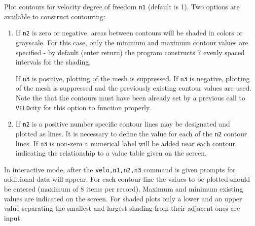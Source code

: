 \headb

Plot contours for velocity degree of freedom {\tt n1}
(default is 1).
Two options are available to construct contouring:
\begin{enumerate}
\item{
If {\tt n2} is zero or negative, areas between contours
will be shaded in colors or grayscale.  For this case, only
the minimum and maximum contour values are specified - by
default (enter return) the program constructs 7 evenly
spaced intervals for the shading.

If {\tt n3} is positive, plotting of the mesh is suppressed.
If {\tt n3} is negative, plotting
of the mesh is suppressed and the previously existing
contour values are used.  Note the that the contours must
have been already set by a previous call to {\tt VELO}city for this
option to function properly.}
\item{
If {\tt n2} is a positive number specific contour lines may be designated
and plotted as lines. It is necessary to define the value for each of the
{\tt n2} contour lines.
If {\tt n3} is non-zero a numerical label will
be added near each contour indicating the relationship to a
value table given on the screen.}
\end{enumerate}

In interactive mode, after the {\tt velo,n1,n2,n3} command
is given prompts for additional data will appear.  For each
contour line the values to be plotted should be entered
(maximum of 8 items per record).  Maximum and minimum existing values
are indicated on the screen.
For shaded plots only a lower and an upper value separating the smallest
and largest shading from their adjacent ones are input.
\vfill
\eject

